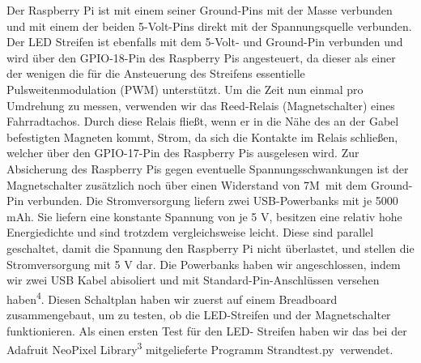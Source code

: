 \documentclass [a4paper, 11pt] {article}
\begin{document}
Der Raspberry Pi ist mit einem seiner Ground-Pins mit der Masse verbunden und mit einem der beiden 5-Volt-Pins direkt mit der Spannungsquelle verbunden. Der LED Streifen ist ebenfalls mit dem 5-Volt- und Ground-Pin verbunden und wird über den GPIO-18-Pin des Raspberry Pis angesteuert, da dieser als einer der wenigen die für die Ansteuerung des Streifens essentielle Pulsweitenmodulation (PWM) unterstützt. Um die Zeit nun einmal pro Umdrehung zu messen, verwenden wir das Reed-Relais (Magnetschalter) eines Fahrradtachos. Durch diese Relais fließt, wenn er in die Nähe des an der Gabel befestigten Magneten kommt, Strom, da sich die Kontakte im Relais schließen, welcher über den GPIO-17-Pin des Raspberry Pis ausgelesen wird. Zur Absicherung des Raspberry Pis gegen eventuelle Spannungsschwankungen ist der Magnetschalter zusätzlich noch über einen Widerstand von 7M\textOmega\ mit dem Ground-Pin verbunden. Die Stromversorgung liefern zwei USB-Powerbanks mit je 5000 mAh. Sie liefern eine konstante Spannung von je 5 V, besitzen eine relativ hohe Energiedichte und sind trotzdem vergleichsweise leicht. Diese sind parallel geschaltet, damit die Spannung den Raspberry Pi nicht überlastet, und stellen die Stromversorgung mit 5 V dar. Die Powerbanks haben wir angeschlossen, indem wir zwei USB Kabel abisoliert und mit Standard-Pin-Anschlüssen versehen haben\textsuperscript{4}. Diesen Schaltplan haben wir zuerst auf einem Breadboard zusammengebaut, um zu testen, ob die LED-Streifen und der Magnetschalter funktionieren. Als einen ersten Test für den LED- Streifen haben wir das bei der Adafruit NeoPixel Library\textsuperscript{3} mitgelieferte Programm \glqq Strandtest.py\grqq\ verwendet.
\end{document}
